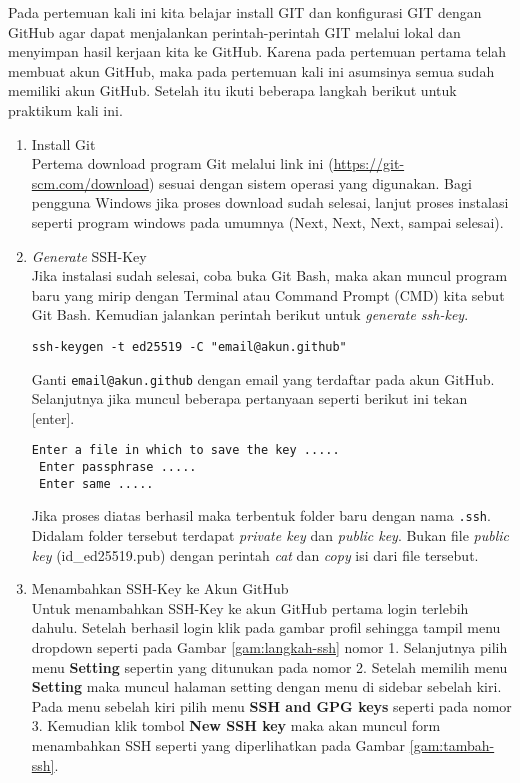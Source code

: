 \documentclass[a4paper]{tufte-handout}
\begin{document}
\clearpage
{}


Pada pertemuan kali ini kita belajar install GIT dan konfigurasi GIT dengan GitHub agar dapat menjalankan perintah-perintah GIT melalui lokal dan menyimpan hasil kerjaan kita ke GitHub. Karena pada pertemuan pertama telah membuat akun GitHub, maka pada pertemuan kali ini asumsinya semua sudah memiliki akun GitHub. Setelah itu ikuti beberapa langkah berikut untuk praktikum kali ini.

\begin{enumerate}
\item Install Git \\
Pertema download program Git melalui link ini (\url{https://git-scm.com/download}) sesuai dengan sistem operasi yang digunakan. Bagi pengguna Windows jika proses download sudah selesai, lanjut proses instalasi seperti program windows pada umumnya (Next, Next, Next, sampai selesai).

\item \textit{Generate} SSH-Key \\
Jika instalasi sudah selesai, coba buka Git Bash, maka akan muncul program baru yang mirip dengan Terminal atau Command Prompt (CMD) kita sebut Git Bash. Kemudian jalankan perintah berikut untuk \textit{generate ssh-key}.

\begin{lstlisting}[language=Terminal]
 ssh-keygen -t ed25519 -C "email@akun.github"
\end{lstlisting}

Ganti {\tt email@akun.github} dengan email yang terdaftar pada akun GitHub. Selanjutnya jika muncul beberapa pertanyaan seperti berikut ini tekan [enter].

\begin{lstlisting}[language=Terminal]
 Enter a file in which to save the key .....
 Enter passphrase .....
 Enter same .....
\end{lstlisting}

Jika proses diatas berhasil maka terbentuk folder baru dengan nama {\tt .ssh}. Didalam folder tersebut terdapat \textit{private key} dan \textit{public key}. Bukan file \textit{public key} (id\_ed25519.pub) dengan perintah \textit{cat} dan \textit{copy} isi dari file tersebut.

\item Menambahkan SSH-Key ke Akun GitHub \\
Untuk menambahkan SSH-Key ke akun GitHub pertama login terlebih dahulu. Setelah berhasil login klik pada gambar profil sehingga tampil menu dropdown seperti pada Gambar \ref{gam:langkah-ssh} nomor 1. Selanjutnya pilih menu \textbf{Setting} sepertin yang ditunukan pada nomor 2. Setelah memilih menu \textbf{Setting} maka muncul halaman setting dengan menu di sidebar sebelah kiri. Pada menu sebelah kiri pilih menu \textbf{SSH and GPG keys} seperti pada nomor 3. Kemudian klik tombol \textbf{New SSH key} maka akan muncul form menambahkan SSH seperti yang diperlihatkan pada Gambar \ref{gam:tambah-ssh}.


\end{enumerate}
\end{document}
